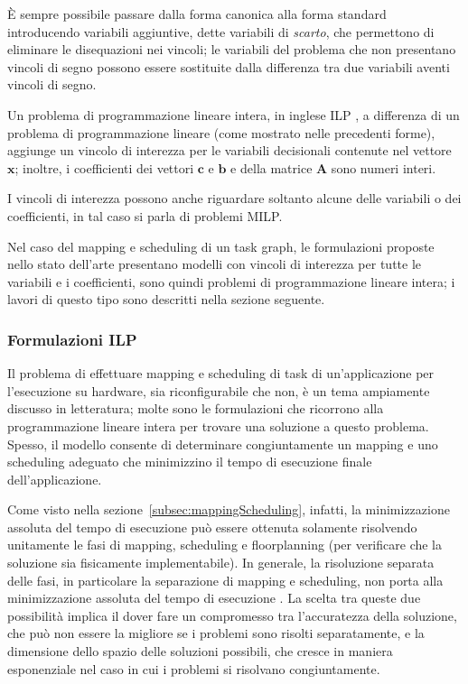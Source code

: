 È sempre possibile passare dalla forma canonica alla forma standard 
introducendo variabili aggiuntive, dette variabili di \emph{scarto}, che 
permettono di eliminare le disequazioni nei vincoli; le variabili del problema 
che non presentano vincoli di segno possono essere sostituite dalla differenza 
tra due variabili aventi vincoli di segno.

Un problema di programmazione lineare intera, in inglese \ac{ILP}
\cite{ILPBook}, a differenza di un problema di programmazione lineare (come mostrato
nelle precedenti forme), aggiunge un vincolo di interezza per le variabili decisionali
contenute nel vettore $\mathbf{x}$; inoltre, i coefficienti dei vettori $\mathbf{c}$
e $\mathbf{b}$ e della matrice $\mathbf{A}$ sono numeri interi.

I vincoli di interezza possono anche riguardare soltanto alcune delle variabili o 
dei coefficienti, in tal caso si parla di problemi \ac{MILP}.

Nel caso del mapping e scheduling di un task graph, le formulazioni proposte nello 
stato dell'arte presentano modelli con vincoli di interezza per tutte le 
variabili e i coefficienti, sono quindi problemi di programmazione lineare 
intera; i lavori di questo tipo sono descritti nella sezione seguente.


\subsubsection{Formulazioni \acs{ILP}} Il problema di effettuare mapping e
scheduling di task di un'applicazione per l'esecuzione su hardware, sia
riconfigurabile che non, è un tema ampiamente discusso in letteratura; molte
sono le formulazioni che ricorrono alla programmazione lineare intera per
trovare una soluzione a questo problema. Spesso, il modello consente di
determinare congiuntamente un mapping e uno scheduling adeguato che minimizzino
il tempo di esecuzione finale dell'applicazione.

Come visto nella sezione~\ref{subsec:mappingScheduling}, infatti, la
minimizzazione assoluta del tempo di esecuzione può essere ottenuta solamente
risolvendo unitamente le fasi di mapping, scheduling e floorplanning (per
verificare che la soluzione sia fisicamente implementabile). In generale, la
risoluzione separata delle fasi, in particolare la separazione di mapping e
scheduling, non porta alla minimizzazione assoluta del tempo di esecuzione
\cite{AntColonyOptimization}. La scelta tra queste due possibilità implica il
dover fare un compromesso tra l'accuratezza della soluzione, che può non essere
la migliore se i problemi sono risolti separatamente, e la dimensione dello
spazio delle soluzioni possibili, che cresce in maniera esponenziale nel caso
in cui i problemi si risolvano congiuntamente.

